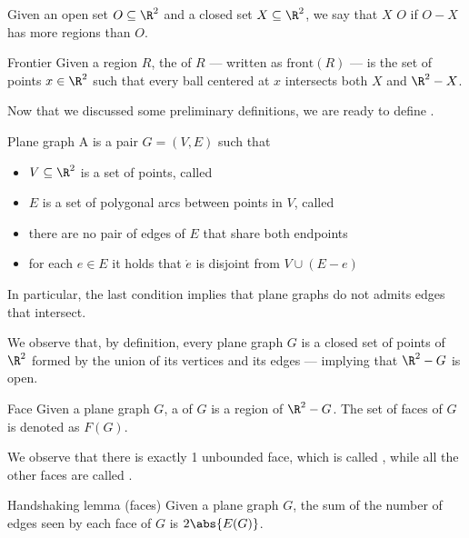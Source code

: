 \documentclass[a4paper, 12pt]{report}
\begin{document}
    Given an open set $O \subseteq \R^2$ and a closed set $X \subseteq \R^2$, we say that $X$  $O$ if $O - X$ has more regions than $O$.

    \begin{frameddefn}{Frontier}
        Given a region $R$, the  of $R$ --- written as $\mathrm{front}(R)$ --- is the set of points $x \in \R^2$ such that every ball centered at $x$ intersects both $X$ and $\R^2 - X$.
    \end{frameddefn}

    Now that we discussed some preliminary definitions, we are ready to define .

    \begin{frameddefn}{Plane graph}
        A  is a pair $G = (V, E)$ such that

        \begin{itemize}
            \item $V \subseteq \R^2$ is a set of points, called 
            \item $E$ is a set of polygonal arcs between points in $V$, called 
            \item there are no pair of edges of $E$ that share both endpoints
            \item for each $e \in E$ it holds that $\mathring e$ is disjoint from $V \cup (E - e)$
        \end{itemize}
    \end{frameddefn}

    In particular, the last condition implies that plane graphs do not admits edges that intersect.

    We observe that, by definition, every plane graph $G$ is a closed set of points of $\R^2$ formed by the union of its vertices and its edges --- implying that $\R^2 - G$ is open.

    \begin{frameddefn}{Face}
        Given a plane graph $G$, a  of $G$ is a region of $\R^2 - G$. The set of faces of $G$ is denoted as $F(G)$.
    \end{frameddefn}

    We observe that there is exactly 1 unbounded face, which is called , while all the other faces are called .

    \begin{framedlem}{Handshaking lemma (faces)}
        Given a plane graph $G$, the sum of the number of edges seen by each face of $G$ is $2 \abs{E(G)}$.
    \end{framedlem}
\end{document}
